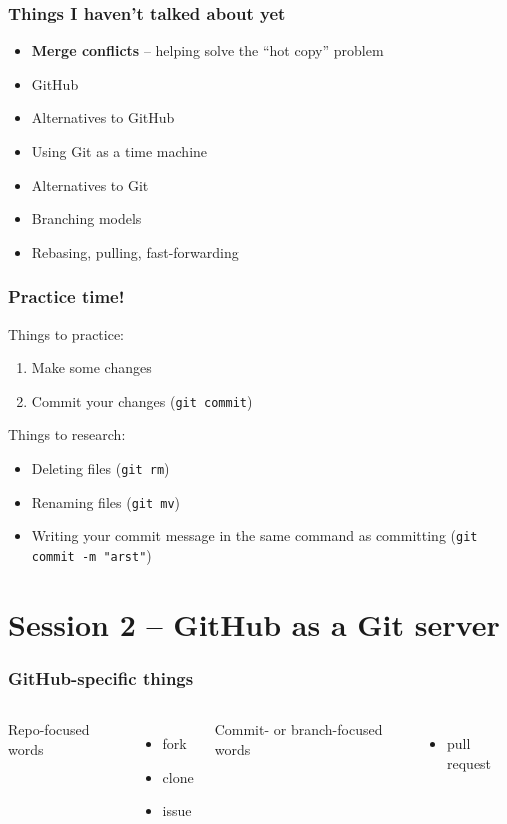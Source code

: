 \documentclass[14pt,aspectratio=1610]{beamer} %
\newcommand{\fframe}[2]{
   \begin{frame}
\frametitle{#1}
#2
\end{frame}
}
\begin{document}
\fframe{Things I haven't talked about yet}
{
	\begin{itemize}
		\item {\bf Merge conflicts} -- helping solve the ``hot copy'' problem
		\item GitHub
		\item Alternatives to GitHub
		\item Using Git as a time machine
		\item Alternatives to Git
		\item Branching models
		\item Rebasing, pulling, fast-forwarding
	\end{itemize}
}



\fframe{Practice time!}
{
Things to practice:
	\begin{enumerate}
		\item Make some changes
		\item Commit your changes ({\tt git commit})
	\end{enumerate}

	Things to research:
	\begin{itemize}
		\item Deleting files ({\tt git rm})
		\item Renaming files ({\tt git mv})
		\item Writing your commit message in the same command as committing ({\tt git commit -m "arst"})
	\end{itemize}
}




























\section{Session 2 -- GitHub as a Git server}

\fframe{GitHub-specific things}
{
		\begin{columns}[t]
	\column{2in}
	Repo-focused words
	\begin{itemize}
		\item fork
		\item clone
		\item issue


		
	\end{itemize}

	\column{2in}
	Commit- or branch-focused words
	\begin{itemize}		
		\item pull request
	\end{itemize}
	\end{columns}
}
\end{document}

